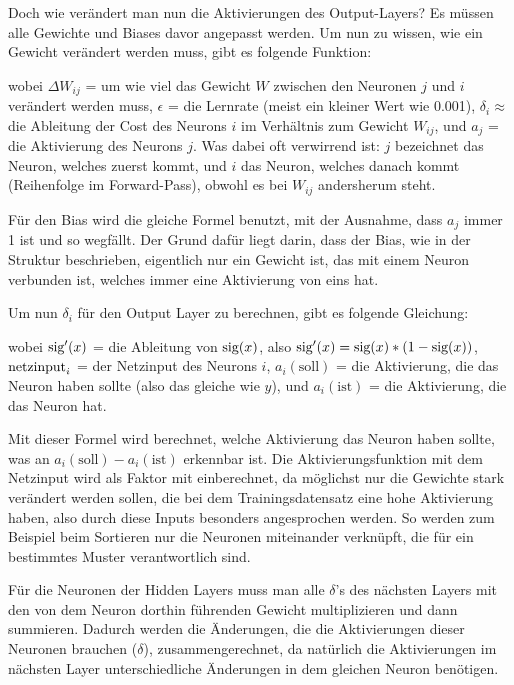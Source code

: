 \documentclass[11pt]{scrartcl}
\begin{document}

	Doch wie verändert man nun die Aktivierungen des Output-Layers? Es müssen alle Gewichte und Biases davor angepasst werden. Um nun zu wissen, wie ein Gewicht verändert werden muss, gibt es folgende Funktion:

	\form{\[
		\Delta W_{ij} = \epsilon * \delta_i * a_j
	\]}

	wobei $\Delta W_{ij}$ = um wie viel das Gewicht $W$ zwischen den Neuronen $j$ und $i$ verändert werden muss, $\epsilon$ = die Lernrate (meist ein kleiner Wert wie 0.001), $\delta_i \approx$ die Ableitung der Cost des Neurons $i$ im Verhältnis zum Gewicht $W_{ij}$, und $a_j$ = die Aktivierung des Neurons $j$. Was dabei oft verwirrend ist: $j$ bezeichnet das Neuron, welches zuerst kommt, und $i$ das Neuron, welches danach kommt (Reihenfolge im Forward-Pass), obwohl es bei $W_{ij}$ andersherum steht.

	Für den Bias wird die gleiche Formel benutzt, mit der Ausnahme, dass $a_j$ immer 1 ist und so wegfällt. Der Grund dafür liegt darin, dass der Bias, wie in der Struktur beschrieben, eigentlich nur ein Gewicht ist, das mit einem Neuron verbunden ist, welches immer eine Aktivierung von eins hat.

	Um nun $\delta_i$ für den Output Layer zu berechnen, gibt es folgende Gleichung: 

	\form{\[
		\delta_i = \sig '\left({\netin}_i\right) * (a_i (\textrm{soll}) - a_i (\textrm{ist})) 
	\]}

	wobei $\textrm{sig} '(x)$ = die Ableitung von $\textrm{sig}(x)$, also $\textrm{sig}'(x) = \textrm{sig}(x) * (1 - \textrm{sig}(x))$, $\textrm{netzinput}_i$ = der Netzinput des Neurons $i$, $a_i(\textrm{soll})$ = die Aktivierung, die das Neuron haben sollte (also das gleiche wie $y$), und $a_i(\textrm{ist})$ = die Aktivierung, die das Neuron hat.

	Mit dieser Formel wird berechnet, welche Aktivierung das Neuron haben sollte, was an $a_i(\textrm{soll}) - a_i(\textrm{ist})$ erkennbar ist. Die Aktivierungsfunktion mit dem Netzinput wird als Faktor mit einberechnet, da möglichst nur die Gewichte stark verändert werden sollen, die bei dem Trainingsdatensatz eine hohe Aktivierung haben, also durch diese Inputs besonders angesprochen werden. So werden zum Beispiel beim Sortieren nur die Neuronen miteinander verknüpft, die für ein bestimmtes Muster verantwortlich sind.
	
	Für die Neuronen der Hidden Layers muss man alle $\delta$'s des nächsten Layers mit den von dem Neuron dorthin führenden Gewicht multiplizieren und dann summieren. Dadurch werden die Änderungen, die die Aktivierungen dieser Neuronen brauchen ($\delta$), zusammengerechnet, da natürlich die Aktivierungen im nächsten Layer unterschiedliche Änderungen in dem gleichen Neuron benötigen.
	
\end{document}
